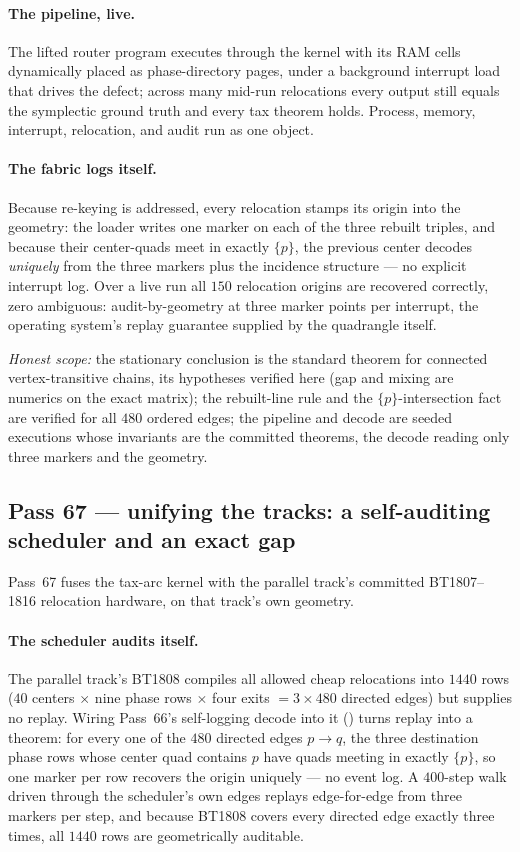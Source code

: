 \documentclass[11pt]{article}
\begin{document}
\paragraph{The pipeline, live.}  The lifted router program executes through the
kernel with its RAM cells dynamically placed as phase-directory pages, under a
background interrupt load that drives the defect; across many mid-run
relocations every output still equals the symplectic ground truth and every tax
theorem holds.  Process, memory, interrupt, relocation, and audit run as one
object.

\paragraph{The fabric logs itself.}  Because re-keying is addressed, every
relocation stamps its origin into the geometry: the loader writes one marker on
each of the three rebuilt triples, and because their center-quads meet in
exactly \(\{p\}\), the previous center decodes \emph{uniquely} from the three
markers plus the incidence structure --- no explicit interrupt log.  Over a live
run all \(150\) relocation origins are recovered correctly, zero ambiguous:
audit-by-geometry at three marker points per interrupt, the operating system's
replay guarantee supplied by the quadrangle itself.

\emph{Honest scope:} the stationary conclusion is the standard theorem for
connected vertex-transitive chains, its hypotheses verified here (gap and
mixing are numerics on the exact matrix); the rebuilt-line rule and the
\(\{p\}\)-intersection fact are verified for all \(480\) ordered edges; the
pipeline and decode are seeded executions whose invariants are the committed
theorems, the decode reading only three markers and the geometry.

\subsection{Pass 67 --- unifying the tracks: a self-auditing scheduler and an exact gap}
\label{sec:capstone-sixtyseven}

Pass~67 fuses the tax-arc kernel with the parallel track's committed
BT1807--1816 relocation hardware, on that track's own geometry.

\paragraph{The scheduler audits itself.}  The parallel track's BT1808 compiles
all allowed cheap relocations into \(1440\) rows (\(40\) centers \(\times\) nine
phase rows \(\times\) four exits \(=3\times480\) directed edges) but supplies no
replay.  Wiring Pass~66's self-logging decode into it
() turns replay into a theorem:
for every one of the \(480\) directed edges \(p\to q\), the three destination
phase rows whose center quad contains \(p\) have quads meeting in exactly
\(\{p\}\), so one marker per row recovers the origin uniquely --- no event log.
A \(400\)-step walk driven through the scheduler's own edges replays
edge-for-edge from three markers per step, and because BT1808 covers every
directed edge exactly three times, all \(1440\) rows are geometrically
auditable.
\end{document}
